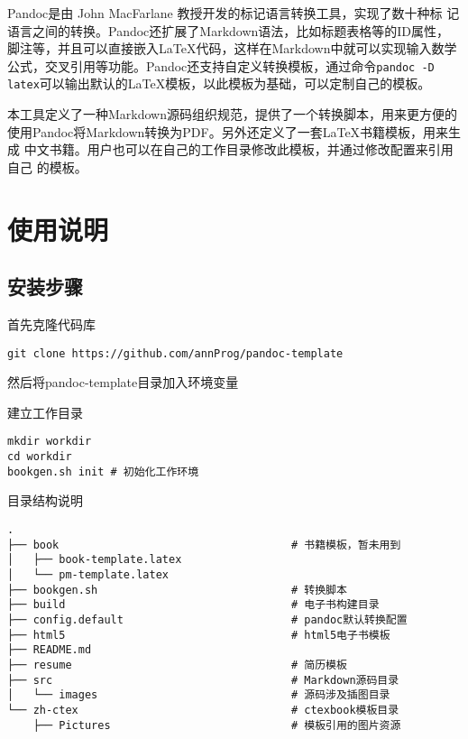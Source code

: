 \documentclass[fancyhdr,bookmark]{ctexbook}
\newcommand{\passthrough}[1]{#1}
\begin{document}
Pandoc是由 John MacFarlane 教授开发的标记语言转换工具，实现了数十种标
记语言之间的转换。Pandoc还扩展了Markdown语法，比如标题表格等的ID属性，
脚注等，并且可以直接嵌入LaTeX代码，这样在Markdown中就可以实现输入数学
公式，交叉引用等功能。Pandoc还支持自定义转换模板，通过命令\passthrough{\lstinline!pandoc -D latex!}可以输出默认的LaTeX模板，以此模板为基础，可以定制自己的模板。

本工具定义了一种Markdown源码组织规范，提供了一个转换脚本，用来更方便的
使用Pandoc将Markdown转换为PDF。另外还定义了一套LaTeX书籍模板，用来生成
中文书籍。用户也可以在自己的工作目录修改此模板，并通过修改配置来引用自己
的模板。


{
\hypersetup{linkcolor=black}
\setcounter{tocdepth}{2}
\tableofcontents
{}
}
\listoftables
{}
\listoffigures
{}



\mainmatter
\hypertarget{ux4f7fux7528ux8bf4ux660e}{%
\chapter{使用说明}\label{ux4f7fux7528ux8bf4ux660e}}

\hypertarget{ux5b89ux88c5ux6b65ux9aa4}{%
\section{安装步骤}\label{ux5b89ux88c5ux6b65ux9aa4}}

首先克隆代码库

\begin{lstlisting}
git clone https://github.com/annProg/pandoc-template
\end{lstlisting}

然后将pandoc-template目录加入环境变量

建立工作目录

\begin{lstlisting}
mkdir workdir
cd workdir
bookgen.sh init # 初始化工作环境
\end{lstlisting}

目录结构说明

\begin{lstlisting}
.
├── book                                    # 书籍模板，暂未用到
│   ├── book-template.latex
│   └── pm-template.latex
├── bookgen.sh                              # 转换脚本
├── build                                   # 电子书构建目录
├── config.default                          # pandoc默认转换配置
├── html5                                   # html5电子书模板
├── README.md
├── resume                                  # 简历模板
├── src                                     # Markdown源码目录
│   └── images                              # 源码涉及插图目录
└── zh-ctex                                 # ctexbook模板目录
    ├── Pictures                            # 模板引用的图片资源
\end{lstlisting}
\end{document}
